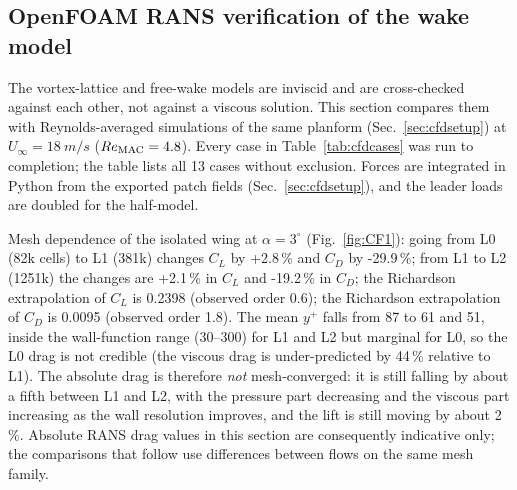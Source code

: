 \subsection{OpenFOAM RANS verification of the wake model}\label{sec:cfd}

The vortex-lattice and free-wake models are inviscid and are cross-checked against each other, not against a viscous solution. This section compares them with Reynolds-averaged simulations of the same planform (Sec.~\ref{sec:cfdsetup}) at $U_\infty=\SI{18}{m/s}$ ($Re_{\mathrm{MAC}}=4.8$). Every case in Table~\ref{tab:cfdcases} was run to completion; the table lists all 13 cases without exclusion. Forces are integrated in Python from the exported patch fields (Sec.~\ref{sec:cfdsetup}), and the leader loads are doubled for the half-model.

\begin{table}[H]\centering\scriptsize\caption{All OpenFOAM cases (leader quantities are full-aircraft values; follower columns are given when a follower is present). $y^+$ is the mean wall-function $y^+$ on the leader; iterations are SIMPLE iterations to the residual-control stop (cap 700).}\label{tab:cfdcases}

\end{table}

Mesh dependence of the isolated wing at $\alpha=3^\circ$ (Fig.~\ref{fig:CF1}): going from L0 (82k cells) to L1 (381k) changes $C_L$ by +2.8\,\% and $C_D$ by -29.9\,\%; from L1 to L2 (1251k) the changes are +2.1\,\% in $C_L$ and -19.2\,\% in $C_D$; the Richardson extrapolation of $C_{L}$ is 0.2398 (observed order 0.6); the Richardson extrapolation of $C_{D}$ is 0.0095 (observed order 1.8). The mean $y^+$ falls from 87 to 61 and 51, inside the wall-function range (30--300) for L1 and L2 but marginal for L0, so the L0 drag is not credible (the viscous drag is under-predicted by 44\,\% relative to L1). The absolute drag is therefore \emph{not} mesh-converged: it is still falling by about a fifth between L1 and L2, with the pressure part decreasing and the viscous part increasing as the wall resolution improves, and the lift is still moving by about 2\,\%. Absolute RANS drag values in this section are consequently indicative only; the comparisons that follow use differences between flows on the same mesh family.

